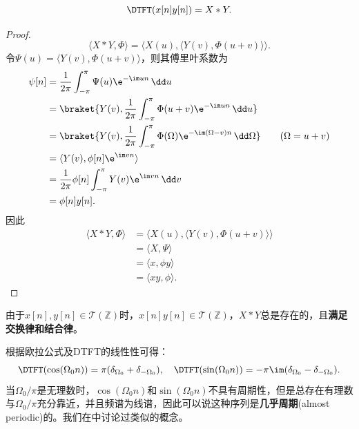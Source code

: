 \begin{theorem}[频域卷积定理]
    \begin{equation}
        \DTFT(x[n]y[n])=X*Y.
    \end{equation}
\end{theorem}
\begin{proof}
    \begin{equation}
        \langle X*Y,\Phi\rangle=\langle X(u),\langle Y(v),\Phi(u+v)\rangle\rangle.
    \end{equation}
    令$\Psi(u)=\langle Y(v),\Phi(u+v)\rangle$，则其傅里叶系数为
    \begin{align}
        \psi[n]&=\frac{1}{2\pi}\int_{-\pi}^{\pi}\Psi(u)\e^{-\im un}\,\dd u \nonumber \\
        &=\braket{Y(v),\frac{1}{2\pi}\int_{-\pi}^{\pi}\Phi(u+v)\e^{-\im un}\,\dd u} \nonumber \\
        &=\braket{Y(v),\frac{1}{2\pi}\int_{-\pi}^{\pi}\Phi(\Omega)\e^{-\im (\Omega-v)n}\,\dd\Omega} \qquad (\Omega=u+v) \nonumber \\
        &=\langle Y(v),\phi[n]\e^{\im vn}\rangle \nonumber \\
        &=\frac{1}{2\pi}\phi[n]\int_{-\pi}^{\pi}Y(v)\e^{\im vn}\,\dd v \nonumber \\
        &=\phi[n]y[n].
    \end{align}
    因此
    \begin{align}
        \langle X*Y,\Phi\rangle&=\langle X(u),\langle Y(v),\Phi(u+v)\rangle\rangle \nonumber \\
        &=\langle X,\Psi\rangle \nonumber \\
        &=\langle x,\phi y\rangle \nonumber \\
        &=\langle xy,\phi\rangle.
    \end{align}
\end{proof}

由于$x[n],y[n]\in\mathcal{T}(\mathbb{Z})$时，$x[n]y[n]\in\mathcal{T}(\mathbb{Z})$，$X*Y$总是存在的，且\textbf{满足交换律和结合律}。

\begin{example}[正弦、余弦序列的离散时间傅里叶变换]\label{exmp:cos_DTFT}
    根据欧拉公式及DTFT的线性性可得：
    \begin{equation}
        \DTFT(\cos(\Omega_0 n))=\pi(\delta_{\Omega_0}+\delta_{-\Omega_0}),\quad \DTFT(\sin(\Omega_0 n))=-\pi\im(\delta_{\Omega_0}-\delta_{-\Omega_0}).
    \end{equation}
    当$\Omega_0/\pi$是无理数时，$\cos(\Omega_0 n)$和$\sin(\Omega_0 n)$不具有周期性，但是总存在有理数与$\Omega_0/\pi$充分靠近，并且频谱为线谱，因此可以说这种序列是\textbf{几乎周期}(almost periodic)的。我们在中讨论过类似的概念。
\end{example}

